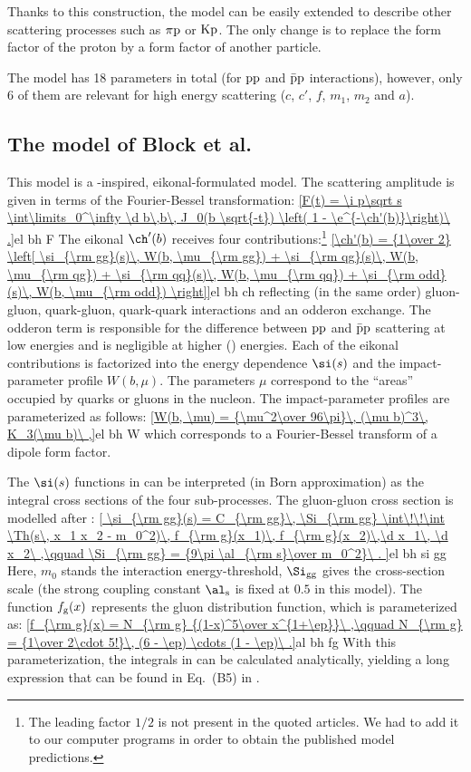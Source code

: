 Thanks to this construction, the model can be easily extended to describe other scattering processes such as $\rm \pi p$ or $\rm Kp$. The only change is to replace the form factor of the proton by a form factor of another particle.

The model has 18 parameters in total (for $\rm pp$ and $\rm \bar p p$ interactions), however, only 6 of them are relevant for high energy scattering ($c$, $c'$, $f$, $m_1$, $m_2$ and $a$).



\subsection{The model of Block et al.}

This model  is a -inspired, eikonal-formulated model. The scattering amplitude is given in terms of the Fourier-Bessel transformation:
\eqref{F(t) = \i p\sqrt s \int\limits_0^\infty \d b\,b\, J_0(b \sqrt{-t}) \left( 1 - \e^{-\ch'(b)}\right)\ .}{el bh F}
The eikonal $\ch'(b)$ receives four contributions:\footnote{%
The leading factor $1/2$ is not present in the quoted articles. We had to add it to our computer programs in order to obtain the published model predictions.
}
\eqref{\ch'(b) = {1\over 2} \left[
	\si_{\rm gg}(s)\, W(b, \mu_{\rm gg}) 
	+ \si_{\rm qg}(s)\, W(b, \mu_{\rm qg}) 
	+ \si_{\rm qq}(s)\, W(b, \mu_{\rm qq}) 
	+ \si_{\rm odd}(s)\, W(b, \mu_{\rm odd}) 
\right]}{el bh ch}
reflecting (in the same order) gluon-gluon, quark-gluon, quark-quark interactions and an odderon exchange. The odderon term is responsible for the difference between $\rm pp$ and $\rm\bar pp$ scattering at low energies and is negligible at higher () energies. Each of the eikonal contributions is factorized into the energy dependence $\si(s)$ and the impact-parameter profile $W(b, \mu)$. The parameters $\mu$ correspond to the ``areas'' occupied by quarks or gluons in the nucleon. The impact-parameter profiles are parameterized as follows:
\eqref{W(b, \mu) = {\mu^2\over 96\pi}\, (\mu b)^3\, K_3(\mu b)\ ,}{el bh W}
which corresponds to a Fourier-Bessel transform of a dipole form factor.

The $\si(s)$ functions in  can be interpreted (in Born approximation) as the integral cross sections of the four sub-processes. The gluon-gluon cross section is modelled after :
\eqref{
	\si_{\rm gg}(s) = C_{\rm gg}\, \Si_{\rm gg} \int\!\!\int \Th(s\, x_1 x_2 - m_0^2)\, f_{\rm g}(x_1)\, f_{\rm g}(x_2)\,\d x_1\, \d x_2\ ,\qquad
	\Si_{\rm gg} = {9\pi \al_{\rm s}\over m_0^2}\ .
}{el bh si gg}
Here, $m_0$ stands the interaction energy-threshold, $\Si_{\rm gg}$ gives the cross-section scale (the strong coupling constant $\al_{\rm s}$ is fixed at $0.5$ in this model). The function $f_{\rm g}(x)$ represents the gluon distribution function, which is parameterized as:
\eqref{f_{\rm g}(x) = N_{\rm g} {(1-x)^5\over x^{1+\ep}}\ ,\qquad N_{\rm g} = {1\over 2\cdot 5!}\, (6 - \ep) \cdots (1 - \ep)\ .}{al bh fg} 
With this parameterization, the integrals in  can be calculated analytically, yielding a long expression that can be found in Eq.~(B5) in .

